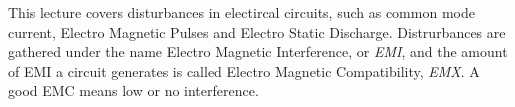 This lecture covers disturbances in electircal circuits, such as common mode
current, Electro Magnetic Pulses and Electro Static Discharge. Distrurbances are
gathered under the name Electro Magnetic Interference, or \textit{EMI}, and the
amount of EMI a circuit generates is called Electro Magnetic Compatibility,
\textit{EMX}. A good EMC means low or no interference. 
